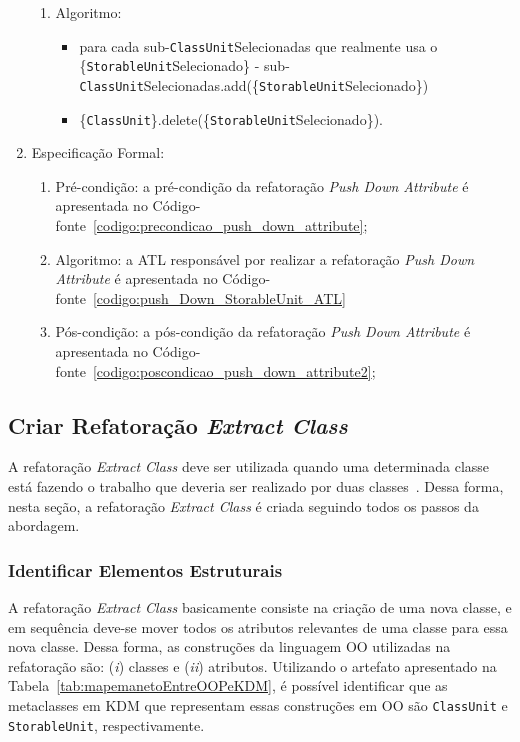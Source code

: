 \begin{enumerate}
\begin{enumerate}
			\item Algoritmo: 
			    \begin{itemize}
			        \item para cada sub-\texttt{ClassUnit}Selecionadas que realmente usa o \{\texttt{StorableUnit}Selecionado\} - sub-\texttt{ClassUnit}Selecionadas.add(\{\texttt{StorableUnit}Selecionado\})
			        \item \{\texttt{ClassUnit}\}.delete(\{\texttt{StorableUnit}Selecionado\}). 
			    \end{itemize} 
	    \end{enumerate}
		\item Especificação Formal:
		\begin{enumerate}
			\item Pré-condição: a pré-condição da refatoração \textit{Push Down Attribute} é apresentada no Código-fonte~\ref{codigo:precondicao_push_down_attribute};
			\item Algoritmo: a ATL responsável por realizar a refatoração \textit{Push Down Attribute} é apresentada no Código-fonte~\ref{codigo:push_Down_StorableUnit_ATL}
			\item Pós-condição: a pós-condição da refatoração \textit{Push Down Attribute} é apresentada no Código-fonte~\ref{codigo:poscondicao_push_down_attribute2};
		\end{enumerate}
	\end{enumerate}		
	
	
	
\subsection{Criar Refatoração \textit{Extract Class}}
A refatoração \textit{Extract Class} deve ser utilizada quando uma determinada classe está fazendo o trabalho que deveria ser realizado por duas classes~\cite{Fowler1999}. Dessa forma, nesta seção, a refatoração \textit{Extract Class} é criada seguindo todos os passos da abordagem. 

\subsubsection{Identificar Elementos Estruturais}

A refatoração \textit{Extract Class} basicamente consiste na criação de uma nova classe, e em sequência deve-se mover todos os atributos relevantes de uma classe para essa nova classe. Dessa forma, as construções da linguagem OO utilizadas na refatoração são: (\textit{i}) classes e (\textit{ii}) atributos. Utilizando o artefato apresentado na Tabela~\ref{tab:mapemanetoEntreOOPeKDM}, é possível identificar que as metaclasses em KDM que representam essas construções em OO são \texttt{ClassUnit} e \texttt{StorableUnit}, respectivamente.

